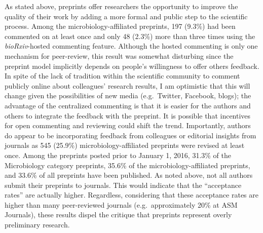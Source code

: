\documentclass[11,]{article}
\begin{document}
As stated above, preprints offer researchers the opportunity to improve
the quality of their work by adding a more formal and public step to the
scientific process. Among the microbiology-affiliated preprints, 197
(9.3\%) had been commented on at least once and only 48 (2.3\%) more
than three times using the \emph{bioRxiv}-hosted commenting feature.
Although the hosted commenting is only one mechanism for peer-review,
this result was somewhat disturbing since the preprint model implicitly
depends on people's willingness to offer others feedback. In spite of
the lack of tradition within the scientific community to comment
publicly online about colleagues' research results, I am optimistic that
this will change given the possibilities of new media (e.g.~Twitter,
Facebook, blogs); the advantage of the centralized commenting is that it
is easier for the authors and others to integrate the feedback with the
preprint. It is possible that incentives for open commenting and
reviewing could shift the trend. Importantly, authors do appear to be
incorporating feedback from colleagues or editorial insights from
journals as 545 (25.9\%) microbiology-affiliated preprints were revised
at least once. Among the preprints posted prior to January 1, 2016,
31.3\% of the Microbiology category preprints, 35.6\% of the
microbiology-affiliated preprints, and 33.6\% of all preprints have been
published. As noted above, not all authors submit their preprints to
journals. This would indicate that the ``acceptance rates'' are actually
higher. Regardless, considering that these acceptance rates are higher
than many peer-reviewed journals (e.g.~approximately 20\% at ASM
Journals), these results dispel the critique that preprints represent
overly preliminary research.
\end{document}
